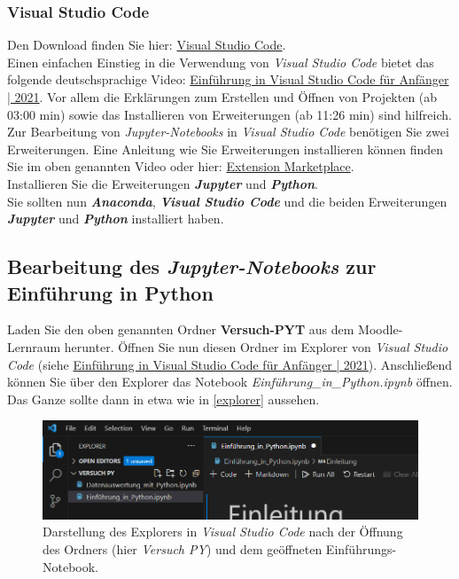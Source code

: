 \documentclass[12pt]{scrbook}
\begin{document}
\subsubsection{Visual Studio Code}
Den Download finden Sie hier: \href{https://code.visualstudio.com/download}{Visual Studio Code}.\\
\newline
Einen einfachen Einstieg in die Verwendung von \textit{Visual Studio Code} bietet das folgende deutschsprachige Video: \href{https://www.youtube.com/watch?v=_-IDIkoo2ZA&ab_channel=FabianHiller}{Einführung in Visual Studio Code für Anfänger | 2021}. 
Vor allem die Erklärungen zum Erstellen und Öffnen von Projekten (ab 03:00 min) sowie das Installieren von Erweiterungen (ab 11:26 min) sind hilfreich.\\
\newline
Zur Bearbeitung von \textit{Jupyter-Notebooks} in \textit{Visual Studio Code} benötigen Sie zwei Erweiterungen. Eine Anleitung wie Sie Erweiterungen installieren können finden Sie im oben genannten Video oder hier: \href{https://code.visualstudio.com/docs/editor/extension-marketplace}{Extension Marketplace}.\\
Installieren Sie die Erweiterungen \textbf{\textit{Jupyter}} und \textbf{\textit{Python}}.\\
\newline
Sie sollten nun \textbf{\textit{Anaconda}}, \textbf{\textit{Visual Studio Code}} und die beiden Erweiterungen \textbf{\textit{Jupyter}} und \textbf{\textit{Python}} installiert haben.




\subsection{Bearbeitung des \textit{Jupyter-Notebooks} zur Einführung in Python}

Laden Sie den oben genannten Ordner \textbf{Versuch-PYT} aus dem Moodle-Lernraum herunter. Öffnen Sie nun diesen Ordner im Explorer von \textit{Visual Studio Code} (siehe \href{https://www.youtube.com/watch?v=_-IDIkoo2ZA&ab_channel=FabianHiller}{Einführung in Visual Studio Code für Anfänger | 2021}). Anschließend können Sie über den Explorer das Notebook \textit{Einführung\_in\_Python.ipynb} öffnen. Das Ganze sollte dann in etwa wie in \autoref{explorer} aussehen. 

\begin{figure}[ht]
\center
\includegraphics[scale=0.8]{Explorer_VSCode.png}
\caption{Darstellung des Explorers in \textit{Visual Studio Code} nach der Öffnung des Ordners (hier \textit{Versuch PY}) und dem geöffneten Einführungs-Notebook.}
\label{explorer}
\end{figure}
\end{document}
